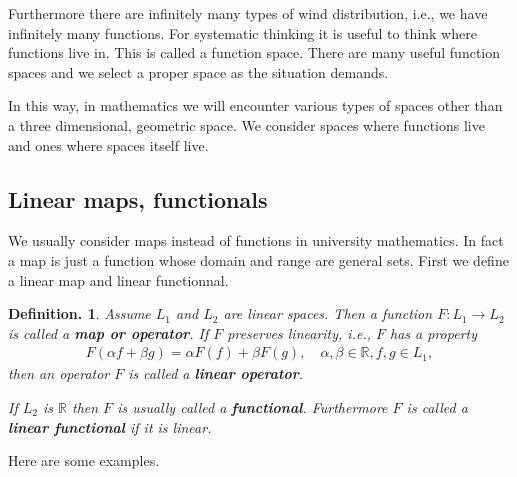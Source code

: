 \documentclass[openany, a4paper, oneside]{book}
\theoremstyle{break}
\theoremstyle{breakdefn}
\newtheorem{defn}[thm]{Definition.}
\newcommand{\rbk}[1]{\left (#1\right)}
\newcommand{\bbR}{\mathbb{R}}
\newcommand{\upbf}[1]{\textup{\textbf{#1}}}
\begin{document}
Furthermore there are infinitely many types of wind distribution,
i.e., we have infinitely many functions.
For systematic thinking it is useful to think where functions live in.
This is called a function space.
There are many useful function spaces and we select a proper space as the situation demands.

In this way, in mathematics we will encounter various types of spaces
other than a three dimensional, geometric space.
We consider spaces where functions live and ones where spaces itself live.
\subsection{Linear maps, functionals}
\label{sec-4-1-2-6}

We usually consider maps instead of functions in university mathematics.
In fact a map is just a function whose domain and range are general sets.
First we define a linear map and linear functionnal.
\begin{defn}
 Assume $L_1$ and $L_2$ are linear spaces.
 Then a function $F \colon L_1 \to L_2$ is called a \upbf{map or operator}.
 If $F$ preserves linearity, i.e., $F$ has a property
 \begin{align}
  F \rbk{\alpha f + \beta g}
  =
  \alpha F(f) + \beta F(g), \quad \alpha, \beta \in \bbR, f, g \in L_1,
 \end{align}
 then an operator $F$ is called a \upbf{linear operator}.

 If $L_2$ is $\bbR$ then $F$ is usually called a \upbf{functional}.
 Furthermore $F$ is called a \upbf{linear functional} if it is linear.
\end{defn}
Here are some examples.
\end{document}
